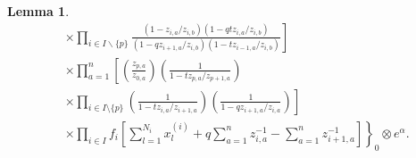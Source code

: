\documentclass{amsart}
\newtheorem{lem}[thm]{Lemma}
\theoremstyle{remark}
\numberwithin{thm}{section}
\numberwithin{equation}{section}
\begin{document}
\begin{lem}
\begin{equation}
\begin{aligned}
&\times\left.
\prod_{i\in I\backslash\{p\}}
\frac{\left(1-z_{i,a}/z_{i,b}\right)\left(1-qtz_{i,a}/z_{i,b}\right)}{\left(1-qz_{i+1,a}/z_{i,b}\right)\left(1-tz_{i-1,a}/z_{i,b}\right)}\right]\\
&\times
\prod_{a=1}^n\left[
\left(\frac{z_{p,a}}{z_{0,a}}\right)\left(\frac{1}{1-tz_{p,a}/z_{p+1,a}}\right)\right.\\
&\times\left.
\prod_{i\in I\setminus\{p\}}
\left(\frac{1}{1-tz_{i,a}/z_{i+1,a}}\right)
\left( \frac{1}{1-qz_{i+1,a}/z_{i,a}} \right)
\right]\\
&\left.\times
\prod_{i\in I}
f_i\left[ \sum_{l=1}^{N_i}  x_{l}^{(i)}+q\sum_{a=1}^n z_{i,a}^{-1}-\sum_{a=1}^n z_{i+1,a}^{-1}  \right]\right\}_0\otimes e^\alpha.
\end{aligned}
\end{equation}
\end{lem}
\end{document}
